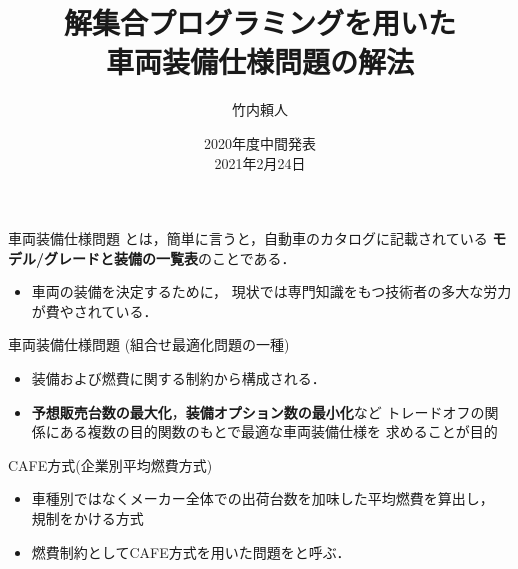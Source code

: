 \documentclass[dvipdfmx, 11pt]{beamer}
\title{解集合プログラミングを用いた\\車両装備仕様問題の解法}
\author{竹内頼人}
\institute{名古屋大学 大学院情報学研究科 番原研究室}
\date{2020年度中間発表\\ 2021年2月24日}
\begin{document}
\frame{\titlepage}
\begin{frame}{車両装備仕様問題}
 とは，簡単に言うと，自動車のカタログに記載されている
 \textbf{モデル/グレードと装備の一覧表}のことである．
 \begin{itemize}
  \item 車両の装備を決定するために，
	現状では専門知識をもつ技術者の多大な労力が費やされている．
 \end{itemize}
 \begin{block}{車両装備仕様問題 (組合せ最適化問題の一種)}
  \begin{itemize}
   \item 装備および燃費に関する制約から構成される．
   \item {\bf 予想販売台数の最大化}，{\bf 装備オプション数の最小化}など
	 トレードオフの関係にある複数の目的関数のもとで最適な車両装備仕様を
	 求めることが目的
  \end{itemize}
 \end{block}
 \begin{alertblock}{CAFE方式(企業別平均燃費方式)}
  \begin{itemize}
   \item 車種別ではなくメーカー全体での出荷台数を加味した平均燃費を算出し，
	 規制をかける方式
   \item 燃費制約としてCAFE方式を用いた問題をと呼ぶ．
  \end{itemize}
 \end{alertblock}
\end{frame}
\end{document}
